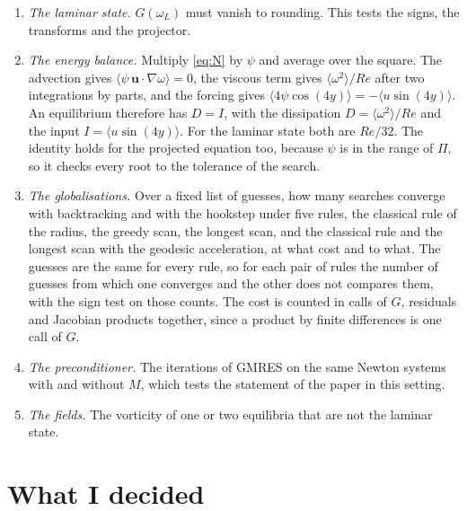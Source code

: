 \documentclass[11pt,a4paper]{article}
\newcommand{\Rey}{\mathit{Re}}
\newcommand{\om}{\omega}
\begin{document}
\begin{enumerate}\setlength{\itemsep}{1pt}
\item \emph{The laminar state.} $G(\om_L)$ must vanish to rounding. This tests the signs, the transforms and the projector.
\item \emph{The energy balance.} Multiply \eqref{eq:N} by $\psi$ and average over the square. The advection gives $\langle\psi\,\mathbf u\cdot\nabla\om\rangle = 0$, the viscous term gives $\langle\om^2\rangle/\Rey$ after two integrations by parts, and the forcing gives $\langle 4\psi\cos(4y)\rangle = -\langle u\sin(4y)\rangle$. An equilibrium therefore has $D = I$, with the dissipation $D = \langle\om^2\rangle/\Rey$ and the input $I = \langle u\sin(4y)\rangle$. For the laminar state both are $\Rey/32$. The identity holds for the projected equation too, because $\psi$ is in the range of $\Pi$, so it checks every root to the tolerance of the search.
\item \emph{The globalisations.} Over a fixed list of guesses, how many searches converge with backtracking and with the hookstep under five rules, the classical rule of the radius, the greedy scan, the longest scan, and the classical rule and the longest scan with the geodesic acceleration, at what cost and to what. The guesses are the same for every rule, so for each pair of rules the number of guesses from which one converges and the other does not compares them, with the sign test on those counts. The cost is counted in calls of $G$, residuals and Jacobian products together, since a product by finite differences is one call of $G$.
\item \emph{The preconditioner.} The iterations of GMRES on the same Newton systems with and without $M$, which tests the statement of the paper in this setting.
\item \emph{The fields.} The vorticity of one or two equilibria that are not the laminar state.
\end{enumerate}

\section{What I decided}
\end{document}
